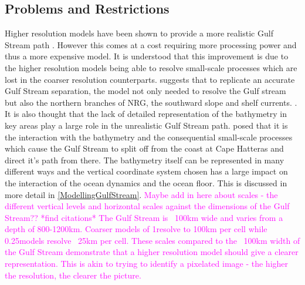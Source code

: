 \documentclass[..\EOYR.tex]{subfiles}
\begin{document}
\subsection{Problems and Restrictions}
Higher resolution models have been shown to provide a more realistic Gulf Stream path . However this comes at a cost requiring more processing power and thus a more expensive model. 
It is understood  that this improvement is due to the higher resolution models being able to resolve small-scale processes which are lost in the coarser resolution counterparts. 
\citep{Ezer2016b} suggests that to replicate an accurate Gulf Stream separation, the model not only needed to resolve the Gulf stream but also the northern branches of NRG, the southward slope and shelf currents. .
 It is also thought that the lack of detailed representation of the bathymetry in key areas play a large role in the unrealistic Gulf Stream path.
 posed that it is the interaction with the bathymetry and the consequential small-scale processes which cause the Gulf Stream to split off from the coast at Cape Hatteras and direct it's path from there.
The bathymetry itself can be represented in many different ways and the vertical coordinate system chosen has a large impact on the interaction of the ocean dynamics and the ocean floor. This is discussed in more detail in \ref{ModellingGulfStream}.
\textcolor{magenta}{Maybe add in here about scales - the different vertical levels and horizontal scales against the dimensions of the Gulf Stream?? *find citations* The Gulf Stream is ~100km wide and varies from a depth of 800-1200km. Coarser models of 1\degree resolve to 100km per cell while 0.25\degree models resolve ~25km per cell. These scales compared to the ~100km width of the Gulf Stream demonstrate that a higher resolution model should give a clearer representation. This is akin to trying to identify a pixelated image - the higher the resolution, the clearer the picture.}
\end{document}
